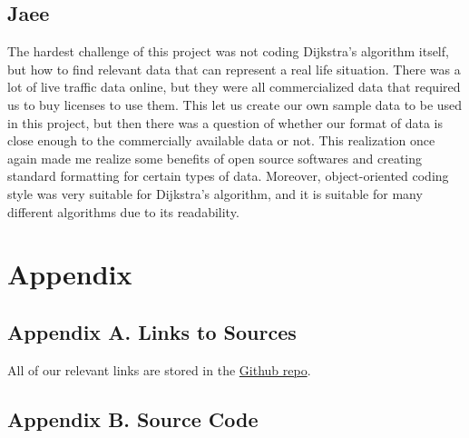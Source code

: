 \documentclass{article}
\begin{document}
\subsection{Jaee}
The hardest challenge of this project was not coding Dijkstra’s algorithm itself, but how to find relevant data that can represent a real life situation. There was a lot of live traffic data online, but they were all commercialized data that required us to buy licenses to use them. This let us create our own sample data to be used in this project, but then there was a question of whether our format of data is close enough to the commercially available data or not. This realization once again made me realize some benefits of open source softwares and creating standard formatting for certain types of data. Moreover, object-oriented coding style was very suitable for Dijkstra’s algorithm, and it is suitable for many different algorithms due to its readability.


\newpage
\section{Appendix}




\subsection{Appendix A. Links to Sources}
All of our relevant links are stored in the  \href{https://github.com/XinranTaoAngela/path_optimization_Algorithm}{Github repo}.



\subsection{Appendix B. Source Code}
\end{document}
